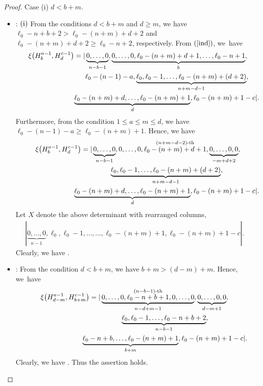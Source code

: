 \documentclass[pdftex]{sigma}
\numberwithin{equation}{section}
\begin{document}
\begin{proof}
Case (i) $d<b+m$.
\begin{itemize}
\item {}: $({\rm i})$ From the conditions $d< b+m$ and $d\geq m$, we have $\ell_{0}-n+b+2>\ell_{0}-(n+m)+d+2$ and $\ell_{0}-(n+m)+d+2\geq \ell_{0}-n+2$, respectively. %
From $(\ref{ind})$, we~have
\begin{gather*}
\xi\bigl(H^{a-1}_{b},H^{c-1}_{d}\bigr)=|\underbrace{0,\dots,0}_{n-b-1},\underbrace{0,\dots,0,\ell_0-(n+m)+d+1,\dots,\ell_{0}-n+1}_{b},\nonumber\\
\hphantom{\xi\bigl(H^{a-1}_{b},H^{c-1}_{d}\bigr)=|}{}
\,\ell_{0}-(n-1)-a,\underbrace{\ell_{0},\ell_{0}-1,\dots,\ell_{0}-(n+m)+(d+2)}_{n+m-d-1},\nonumber\\
\hphantom{\xi\bigl(H^{a-1}_{b},H^{c-1}_{d}\bigr)=|}{}
\underbrace{\ell_{0}-(n+m)+d,\dots,\ell_{0}-(n+m)+1}_{d},\ell_{0}-(n+m)+1-c|.%
\end{gather*}
Furthermore, from the condition $1\leq a\leq m\leq d$, we have $\ell_{0}-(n-1)-a\geq \ell_{0}-(n+m)+1$. Hence, we have
\begin{gather*}
\xi\bigl(H^{a-1}_{b},H^{c-1}_{d}\bigr)=|\underbrace{0,\dots,0}_{n-b-1},
0,\dots,0,\stackrel{(n+m-d-2)\text{-th}}{\ell_0-(n+m)+d+1},\underbrace{0,\dots,0,0}_{-m+d+2},\nonumber\\
\hphantom{\xi\bigl(H^{a-1}_{b},H^{c-1}_{d}\bigr)=|}{}
\underbrace{\ell_{0},\ell_{0}-1,\dots,\ell_{0}-(n+m)+(d+2)}_{n+m-d-1},\nonumber\\
\hphantom{\xi\bigl(H^{a-1}_{b},H^{c-1}_{d}\bigr)=|}{}
\underbrace{\ell_{0}-(n+m)+d,\dots,\ell_{0}-(n+m)+1}_{d},\ell_{0}-(n+m)+1-c|.%
\end{gather*}
Let $X$ denote the above determinant with rearranged columns,
\begin{gather*}
| \underbrace{0,\dots,0}_{n-1},\ell_{0},\ell_{0}-1,\dots,
\dots,\ell_{0}-(n+m)+1,\ell_{0}-(n+m)+1-c|.
\end{gather*}
Clearly, we have .

\item {}: From the condition $d< b+m$, we have $b+m>(d-m)+m$. Hence, we~have
\begin{gather*}
\xi\bigl(H^{a-1}_{d-m},H^{c-1}_{b+m}\bigr)=|\underbrace{0,\dots,0,\stackrel{(n-b-1)\text{-th}}{\ell_{0}-n+b+1}, 0,\dots,0}_{n-d+m-1},%
\underbrace{0,\dots,0,0}_{d-m+1},\\
\hphantom{\xi\bigl(H^{a-1}_{d-m},H^{c-1}_{b+m}\bigr)=|}{}
\underbrace{\ell_{0},\ell_{0}-1,\dots,\ell_{0}-n+b+2}_{n-b-1},\\
\hphantom{\xi\bigl(H^{a-1}_{d-m},H^{c-1}_{b+m}\bigr)=|}{}
\underbrace{\ell_{0}-n+b,\dots,\ell_{0}-(n+m)+1}_{b+m},\ell_{0}-(n+m)+1-c|.%
\end{gather*}
Clearly, we have . Thus the assertion holds.
\end{itemize}


\end{proof}
\end{document}
